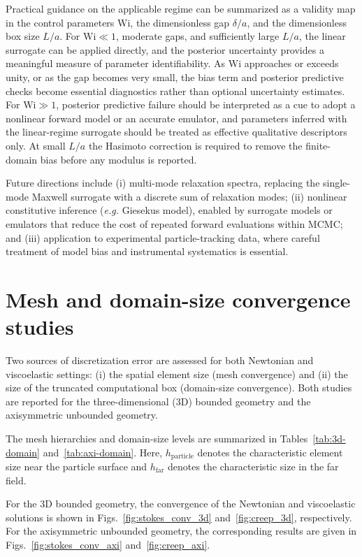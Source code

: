 \documentclass{elsarticle}
\newcommand{\eg}{\emph{e.g.}\xspace}
\newcommand{\wi}{\mathrm{Wi}}
\begin{document}
Practical guidance on the applicable regime can be summarized as a
validity map in the control parameters $\wi$, the dimensionless gap
$\delta/a$, and the dimensionless box size $L/a$. For
$\wi \ll 1$, moderate gaps, and sufficiently large $L/a$, the linear
surrogate can be applied directly, and the
posterior uncertainty provides a meaningful measure of parameter
identifiability. As $\wi$ approaches or exceeds unity, or as the gap
becomes very small, the bias term and
posterior predictive checks become essential diagnostics rather than
optional uncertainty estimates. For $\wi \gg 1$, posterior predictive
failure should be interpreted as a cue to adopt a nonlinear forward
model or an accurate emulator, and parameters inferred with the
linear-regime surrogate should be treated as effective qualitative
descriptors only. At small $L/a$ the Hasimoto correction is required to
remove the finite-domain bias before any modulus is reported.

Future directions include (i) multi-mode relaxation spectra, replacing
the single-mode Maxwell surrogate with a discrete sum of relaxation
modes; (ii) nonlinear constitutive inference (\eg Giesekus model),
enabled by surrogate models or emulators that reduce the cost of
repeated forward evaluations within MCMC; and (iii) application to
experimental particle-tracking data, where careful treatment of model
bias and instrumental systematics is essential.

\appendix

\section{Mesh and domain-size convergence studies}
\label{sec:mesh_conv}

Two sources of discretization error are assessed for both Newtonian and
viscoelastic settings: (i) the spatial element size (mesh convergence)
and (ii) the size of the truncated computational box (domain-size
convergence). Both studies are reported for the three-dimensional (3D)
bounded geometry and the axisymmetric unbounded geometry.

The mesh hierarchies and domain-size levels are summarized in
Tables~\ref{tab:3d-domain} and~\ref{tab:axi-domain}. Here, $h_{\mathrm{particle}}$ denotes the characteristic element size near
the particle surface and $h_{\mathrm{far}}$ denotes the characteristic size in
the far field.

For the 3D bounded geometry, the convergence of the Newtonian and
viscoelastic solutions is shown in
Figs.~\ref{fig:stokes_conv_3d} and~\ref{fig:creep_3d}, respectively.
For the axisymmetric unbounded geometry, the corresponding results are
given in Figs.~\ref{fig:stokes_conv_axi} and~\ref{fig:creep_axi}.
\end{document}
